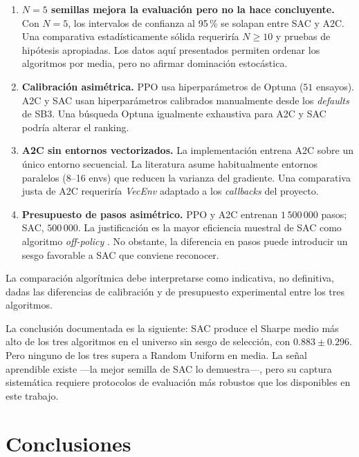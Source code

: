 \documentclass[IB,a4paper]{TFUOC}
\begin{document}
\begin{enumerate}
    \item \textbf{$N=5$ semillas mejora la evaluación pero no la hace concluyente.} Con $N=5$, los intervalos de confianza al 95\,\% se solapan entre SAC y A2C. Una comparativa estadísticamente sólida requeriría $N \geq 10$ y pruebas de hipótesis apropiadas. Los datos aquí presentados permiten ordenar los algoritmos por media, pero no afirmar dominación estocástica.

    \item \textbf{Calibración asimétrica.} PPO usa hiperparámetros de Optuna ($51$ ensayos). A2C y SAC usan hiperparámetros calibrados manualmente desde los \textit{defaults} de SB3. Una búsqueda Optuna igualmente exhaustiva para A2C y SAC podría alterar el ranking.

    \item \textbf{A2C sin entornos vectorizados.} La implementación entrena A2C sobre un único entorno secuencial. La literatura asume habitualmente entornos paralelos (8--16 envs) que reducen la varianza del gradiente. Una comparativa justa de A2C requeriría \textit{VecEnv} adaptado a los \textit{callbacks} del proyecto.

    \item \textbf{Presupuesto de pasos asimétrico.} PPO y A2C entrenan $1\,500\,000$ pasos; SAC, $500\,000$. La justificación es la mayor eficiencia muestral de SAC como algoritmo \textit{off-policy} \citep{haarnoja2018sac}. No obstante, la diferencia en pasos puede introducir un sesgo favorable a SAC que conviene reconocer.
\end{enumerate}

La comparación algorítmica debe interpretarse como indicativa, no definitiva, dadas las diferencias de calibración y de presupuesto experimental entre los tres algoritmos.

La conclusión documentada es la siguiente: SAC produce el Sharpe medio más alto de los tres algoritmos en el universo sin sesgo de selección, con $0.883 \pm 0.296$. Pero ninguno de los tres supera a Random Uniform en media. La señal aprendible existe —la mejor semilla de SAC lo demuestra—, pero su captura sistemática requiere protocolos de evaluación más robustos que los disponibles en este trabajo.

\chapter{Conclusiones}
\label{cap:conclusiones}
\end{document}
